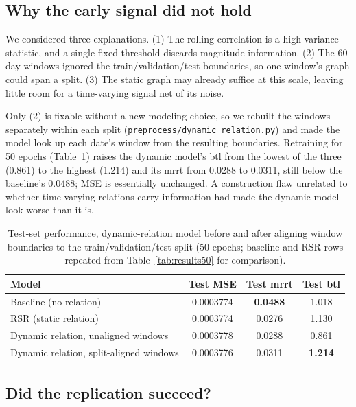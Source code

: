 \documentclass[12pt]{article}
\begin{document}
\subsection{Why the early signal did not hold}

We considered three explanations. (1) The rolling correlation is a high-variance statistic, and a
single fixed threshold discards magnitude information. (2) The 60-day windows ignored the
train/validation/test boundaries, so one window's graph could span a split. (3) The static graph
may already suffice at this scale, leaving little room for a time-varying signal net of its noise.

Only (2) is fixable without a new modeling choice, so we rebuilt the windows separately within
each split (\texttt{preprocess/dynamic\_relation.py}) and made the model look up each date's
window from the resulting boundaries. Retraining for 50 epochs (Table~\ref{tab:results-aligned})
raises the dynamic model's btl from the lowest of the three (0.861) to the highest (1.214) and its
mrrt from 0.0288 to 0.0311, still below the baseline's 0.0488; MSE is essentially unchanged. A
construction flaw unrelated to whether time-varying relations carry information had made the
dynamic model look worse than it is.

\begin{table}[h]
\centering
\caption{Test-set performance, dynamic-relation model before and after aligning window
boundaries to the train/validation/test split (50 epochs; baseline and RSR rows repeated from
Table~\ref{tab:results50} for comparison).}
\label{tab:results-aligned}
\begin{tabular}{lccc}
\toprule
Model & Test MSE & Test mrrt & Test btl \\
\midrule
Baseline (no relation) & 0.0003774 & \textbf{0.0488} & 1.018 \\
RSR (static relation) & 0.0003774 & 0.0276 & 1.130 \\
Dynamic relation, unaligned windows & 0.0003778 & 0.0288 & 0.861 \\
Dynamic relation, split-aligned windows & 0.0003776 & 0.0311 & \textbf{1.214} \\
\bottomrule
\end{tabular}
\end{table}

\subsection{Did the replication succeed?}
\end{document}
